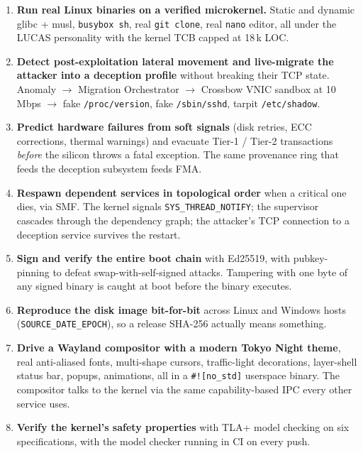 \documentclass[11pt,a4paper]{article}
\begin{document}
\begin{enumerate}[leftmargin=1.6em,itemsep=0.4em]
  \item \textbf{Run real Linux binaries on a verified microkernel.}
        Static and dynamic glibc + musl, \texttt{busybox sh}, real
        \texttt{git clone}, real \texttt{nano} editor, all under the
        LUCAS personality with the kernel TCB capped at 18\,k LOC.

  \item \textbf{Detect post-exploitation lateral movement and
        live-migrate the attacker into a deception profile} without
        breaking their TCP state. Anomaly $\to$ Migration Orchestrator
        $\to$ Crossbow VNIC sandbox at 10\,Mbps $\to$ fake
        \texttt{/proc/version}, fake \texttt{/sbin/sshd}, tarpit
        \texttt{/etc/shadow}.

  \item \textbf{Predict hardware failures from soft signals} (disk
        retries, ECC corrections, thermal warnings) and evacuate
        Tier-1 / Tier-2 transactions \emph{before} the silicon
        throws a fatal exception. The same provenance ring that
        feeds the deception subsystem feeds FMA.

  \item \textbf{Respawn dependent services in topological order} when
        a critical one dies, via SMF. The kernel signals
        \texttt{SYS\_THREAD\_NOTIFY}; the supervisor cascades through
        the dependency graph; the attacker's TCP connection to a
        deception service survives the restart.

  \item \textbf{Sign and verify the entire boot chain} with Ed25519,
        with pubkey-pinning to defeat swap-with-self-signed attacks.
        Tampering with one byte of any signed binary is caught at
        boot before the binary executes.

  \item \textbf{Reproduce the disk image bit-for-bit} across Linux
        and Windows hosts (\texttt{SOURCE\_DATE\_EPOCH}), so a release
        SHA-256 actually means something.

  \item \textbf{Drive a Wayland compositor with a modern Tokyo Night
        theme}, real anti-aliased fonts, multi-shape cursors,
        traffic-light decorations, layer-shell status bar, popups,
        animations, all in a \texttt{\#![no\_std]} userspace
        binary. The compositor talks to the kernel via the same
        capability-based IPC every other service uses.

  \item \textbf{Verify the kernel's safety properties} with TLA+
        model checking on six specifications, with the model
        checker running in CI on every push.
\end{enumerate}
\end{document}
